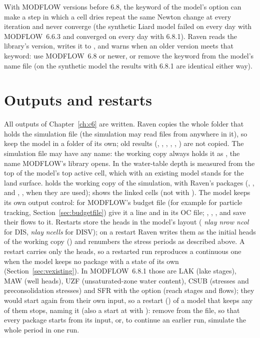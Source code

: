 With MODFLOW versions before 6.8, the  keyword of the model's  option can make a step in
which a cell dries repeat the same Newton change at every iteration and never converge (the synthetic Liard model failed on
every day with MODFLOW~6.6.3 and converged on every day with 6.8.1). Raven reads the library's version, writes it
to , and warns when an older version meets that keyword: use MODFLOW~6.8 or newer, or remove the
keyword from the model's name file (on the synthetic model the results with 6.8.1 are identical either way).

\section{Outputs and restarts}
All outputs of Chapter~\ref{ch:c6} are written. Raven copies the whole folder that holds the simulation file (the simulation
may read files from anywhere in it), so keep the model in a folder of its own; old results (, ,
, , , ) are not copied. The simulation file may have any name: the working copy
always holds it as , the name MODFLOW's library opens. In  the water-table depth is
measured from the top of the model's top active cell, which with an existing model stands for the land surface.  holds the working copy of the simulation, with Raven's packages
(, , and , ,  when they are used);
 shows the linked cells (not with ). The model keeps its own output
control: for MODFLOW's budget file (for example for particle tracking, Section~\ref{sec:budgetfile}) give it a
 line and  in its OC file; , , ,  and  save their flows to it.
Restarts store the heads in the model's layout ( \emph{nlay nrow ncol} for DIS, \emph{nlay}  \emph{ncells}
for DISV); on a restart Raven writes them as the initial heads of the working copy () and renumbers the stress
periods as described above. A restart carries only the heads, so a restarted run reproduces a continuous one when the model
keeps no package with a state of its own (Section~\ref{sec:vexisting}). In MODFLOW~6.8.1 those are LAK (lake stages), MAW
(well heads), UZF (unsaturated-zone water content), CSUB (stresses and preconsolidation stresses) and SFR with the
 option (reach stages and flows); they would start again from their own input, so a restart ()
of a model that keeps any of them stops, naming it (also a start at  with ): remove
 from the  file, so that every package starts from its input, or, to continue an earlier run,
simulate the whole period in one run.

